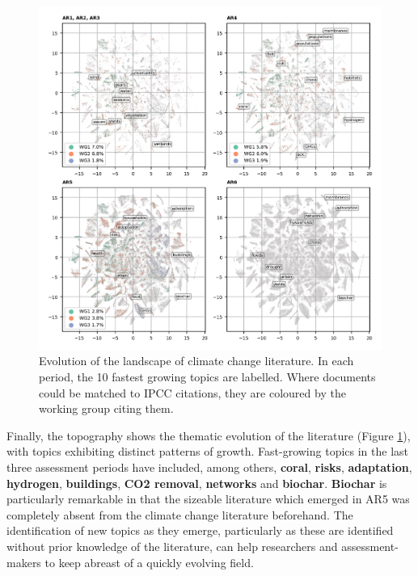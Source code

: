\documentclass{article}
\begin{document}
\begin{linenumbers}
		
		\begin{figure}
			\begin{center}
				\includegraphics[width=180mm]{plots_pub/topic_evolution_4.png}
				\caption{Evolution of the landscape of climate change literature. In each period, the 10 fastest growing topics are labelled. Where documents could be matched to IPCC citations, they are coloured by the working group citing them.}
				\label{evolution-map}
			\end{center}
		\end{figure}
		
		Finally, the topography shows the thematic evolution of the literature (Figure \ref{evolution-map}), with topics exhibiting distinct patterns of growth. Fast-growing topics in the last three assessment periods have included, among others, \textbf{coral}, \textbf{risks}, \textbf{adaptation}, \textbf{hydrogen}, \textbf{buildings}, \textbf{CO2 removal}, \textbf{networks} and \textbf{biochar}. \textbf{Biochar} is particularly remarkable in that the sizeable literature which emerged in AR5 was completely absent from the climate change literature beforehand. 
		The identification of new topics as they emerge, particularly as these are identified without prior knowledge of the literature, can help researchers and assessment-makers to keep abreast of a quickly evolving field.
		

\end{linenumbers}
\end{document}

